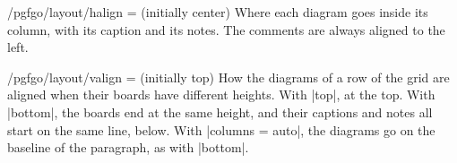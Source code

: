 \begin{key}{/pgfgo/layout/halign =  (initially center)}
	Where each diagram goes inside its column, with its caption and its notes. The comments are always aligned to the left.

	\begin{codeexample}
	\end{codeexample}

\end{key}

\begin{key}{/pgfgo/layout/valign =  (initially top)}
	How the diagrams of a row of the grid are aligned when their boards have different heights. With |top|, at the top. With |bottom|, the boards end at the same height, and their captions and notes all start on the same line, below. With |columns = auto|, the diagrams go on the baseline of the paragraph, as with |bottom|.

	\begin{codeexample}
		\begin{pgfgolayout}[columns = 3, valign = bottom]
			\begin{goban}[5, scale = 0.6]\end{goban}
			\begin{goban}[5x3, scale = 0.6]\end{goban}
			\begin{goban}[9, scale = 0.6]\end{goban}
		\end{pgfgolayout}
	\end{codeexample}

	\begin{pgfgolayout}[columns = 3, valign = bottom]
		\begin{goban}[5, scale = 0.6]\end{goban}
		\begin{goban}[5x3, scale = 0.6]\end{goban}
		\begin{goban}[9, scale = 0.6]\end{goban}
	\end{pgfgolayout}
\end{key}

